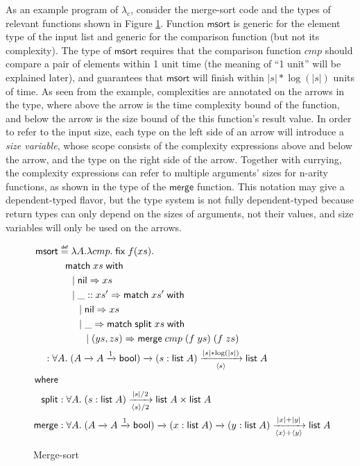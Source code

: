 \documentclass[preprint]{sigplanconf}
\newcommand{\arrow}[4]{#1\xrightarrow[#3]{#2}#4}
\newcommand{\symmatch}{\mathsf{match}}
\newcommand{\symwith}{\mathsf{\;with\;}}
\newcommand{\symlist}{\mathsf{list}}
\newcommand{\symnil}{\mathsf{nil}}
\newcommand{\symfix}{\mathsf{fix}}
\newcommand{\symbool}{\mathsf{bool}}
\newcommand{\symmerge}{\mathsf{merge}}
\newcommand{\intro}[2]{(#1 : #2)}
\newcommand{\symmsort}{\mathsf{msort}}
\newcommand{\symsplit}{\mathsf{split}}
\newcommand\defeq{\mathrel{\overset{\makebox[0pt]{\mbox{\normalfont\tiny\sffamily def}}}{=}}}
\newcommand{\logo}{\lambda_\mathrm{c}}
\newcommand{\Sstats}[1]{\left \langle #1 \right \rangle}
\begin{document}
As an example program of $\logo$, consider the merge-sort code and the types of relevant functions shown in Figure \ref{msort}. Function $\symmsort$ is generic for the element type of the input list and generic for the comparison function (but not its complexity). The type of $\symmsort$ requires that the comparison function $cmp$ should compare a pair of elements within 1 unit time (the meaning of ``1 unit'' will be explained later), and guarantees that $\symmsort$ will finish within $|s|*\log(|s|)$ units of time. As seen from the example, complexities are annotated on the arrows in the type, where above the arrow is the time complexity bound of the function, and below the arrow is the size bound of the this function's result value. In order to refer to the input size, each type on the left side of an arrow will introduce a \emph{size variable}, whose scope consists of the complexity expressions above and below the arrow, and the type on the right side of the arrow. Together with currying, the complexity expressions can refer to multiple arguments' sizes for n-arity functions, as shown in the type of the $\symmerge$ function. This notation may give a dependent-typed flavor, but the type system is not fully dependent-typed because return types can only depend on the sizes of arguments, not their values, and size variables will only be used on the arrows.

\begin{figure}
\begin{align*}
\symmsort &\defeq \lambda A. \lambda cmp.\;\symfix\;f(xs). \\
& \hspace{.1in} \symmatch\;xs\symwith \\
& \hspace{.2in} |\; \symnil\Rightarrow xs \\
& \hspace{.2in} |\; \_::xs' \Rightarrow \symmatch\;xs'\symwith \\
& \hspace{.3in} |\; \symnil\Rightarrow xs \\
& \hspace{.3in} |\; \_ \Rightarrow \symmatch\; \symsplit\;xs \symwith \\
& \hspace{.4in} |\; (ys, zs) \Rightarrow \symmerge\;cmp\;(f\;ys)\;(f\;zs) \\
& \hspace{-0.2in} : \forall A.\;\arrow{(\arrow{A}{}{}{\arrow{A}{1}{}{\symbool}})}{}{}{\arrow{\intro{s}{\symlist\;A}}{|s|*\log(|s|)}{\Sstats{s}}{\symlist\;A}} \\
\mathsf{where} & \\
\symsplit &: \forall A.\;\arrow{\intro{s}{\symlist\;A}}{|s|/2}{\Sstats{s}/2}{\symlist\;A\times\symlist\;A} \\
\symmerge &: \forall A.\;\arrow{(\arrow{A}{}{}{\arrow{A}{1}{}{\symbool}})}{}{}{\arrow{\intro{x}{\symlist\;A}}{}{}{\arrow{\intro{y}{\symlist\;A}}{|x|+|y|}{\Sstats{x}+\Sstats{y}}{\symlist\;A}}}
\end{align*}
\caption{\label{msort}Merge-sort}
\end{figure}
\end{document}
